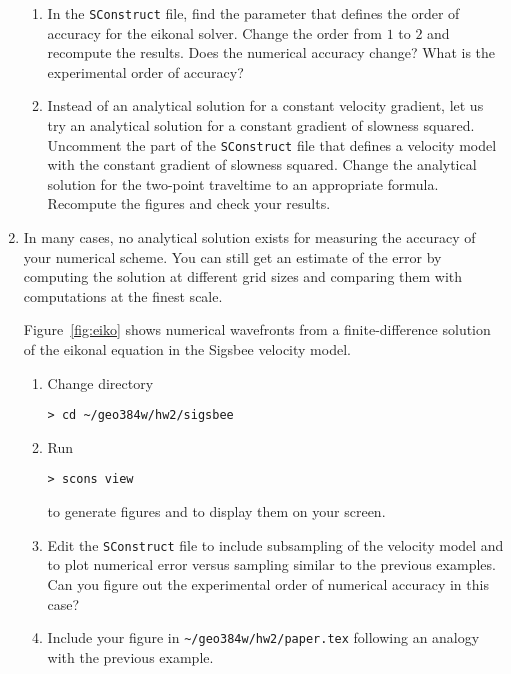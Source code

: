 \begin{enumerate}
\begin{enumerate}
  \item In the \texttt{SConstruct} file, find the parameter that
    defines the order of accuracy for the eikonal solver. Change the
    order from $1$ to $2$ and recompute the results. Does the
    numerical accuracy change? What is the experimental order of
    accuracy? 
  \item Instead of an analytical solution for a constant velocity
    gradient, let us try an analytical solution for a constant
    gradient of slowness squared. Uncomment the part of the
    \texttt{SConstruct} file that defines a velocity model with the
    constant gradient of slowness squared. Change the analytical
    solution for the two-point traveltime to an appropriate formula.
    Recompute the figures and check your results.
  \end{enumerate}

\item In many cases, no analytical solution exists for measuring the
  accuracy of your numerical scheme. You can still get an estimate of
  the error by computing the solution at different grid sizes and
  comparing them with computations at the finest scale.


  {\small
    
  }

  Figure~\ref{fig:eiko} shows numerical wavefronts from a
  finite-difference solution of the eikonal equation in the Sigsbee
  velocity model.


  \begin{enumerate}    
  \item Change directory 
\begin{verbatim}
> cd ~/geo384w/hw2/sigsbee
\end{verbatim}
  \item Run
\begin{verbatim}
> scons view
\end{verbatim}
    to generate figures and to display them on your screen.
  
  \item Edit the \texttt{SConstruct} file to include subsampling of
    the velocity model and to plot numerical error versus sampling
    similar to the previous examples. Can you figure out the
    experimental order of numerical accuracy in this case?
    
  \item Include your figure in \verb#~/geo384w/hw2/paper.tex# following
    an analogy with the previous example.

  \end{enumerate}
  
\end{enumerate}

